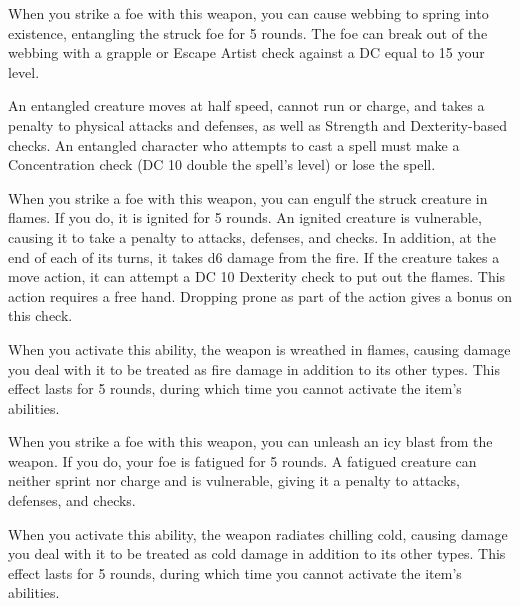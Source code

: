
 When you strike a foe with this weapon, you can cause webbing to spring into existence, entangling the struck foe for 5 rounds.
The foe can break out of the webbing with a grapple or Escape Artist check against a DC equal to 15 \add your level.

An entangled creature moves at half speed, cannot run or charge, and takes a  penalty to physical attacks and defenses, as well as Strength and Dexterity-based checks.
An entangled character who attempts to cast a spell must make a Concentration check (DC 10 \add double the spell's level) or lose the spell.


 When you strike a foe with this weapon, you can engulf the struck creature in flames.
If you do, it is ignited for 5 rounds.
An ignited creature is vulnerable, causing it to take a  penalty to attacks, defenses, and checks.
In addition, at the end of each of its turns, it takes d6 damage from the fire.
If the creature takes a move action, it can attempt a DC 10 Dexterity check to put out the flames.
This action requires a free hand.
Dropping prone as part of the action gives a  bonus on this check.

When you activate this ability, the weapon is wreathed in flames, causing damage you deal with it to be treated as fire damage in addition to its other types.
This effect lasts for 5 rounds, during which time you cannot activate the item's abilities.


 When you strike a foe with this weapon, you can unleash an icy blast from the weapon.
If you do, your foe is fatigued for 5 rounds.
A fatigued creature can neither sprint nor charge and is vulnerable, giving it a  penalty to attacks, defenses, and checks.

When you activate this ability, the weapon radiates chilling cold, causing damage you deal with it to be treated as cold damage in addition to its other types.
This effect lasts for 5 rounds, during which time you cannot activate the item's abilities.

